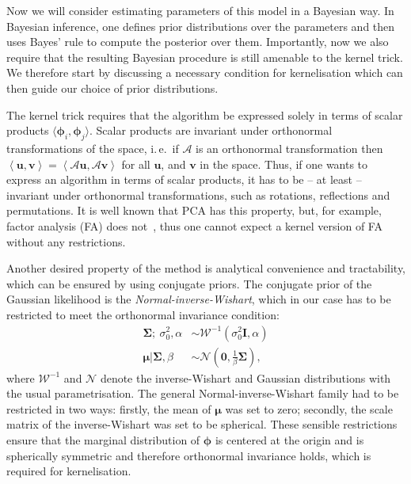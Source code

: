 \documentclass[twoside]{article}
\newcommand{\varconc}{\alpha}
\newcommand{\meanconc}{\beta}
\newcommand{\ie}{i.\,e.\ }
\begin{document}
Now we will consider estimating parameters of this model in a Bayesian way. In Bayesian inference, one defines prior distributions over the parameters and then uses Bayes' rule to compute the posterior over them. Importantly, now we also require that the resulting Bayesian procedure is still amenable to the kernel trick. We therefore start by discussing a necessary condition for kernelisation which can then guide our choice of prior distributions.

The kernel trick requires that the algorithm be expressed solely in terms of scalar products $\langle\bm{\phi}_i,\bm{\phi}_j\rangle$. Scalar products are invariant under orthonormal transformations of the space, \ie if $\mathcal{A}$ is an orthonormal transformation then $\left\langle \bm{u},\bm{v} \right\rangle = \left\langle \mathcal{A}\bm{u},\mathcal{A}\bm{v} \right\rangle$ for all $\bm{u}$, and $\bm{v}$ in the space. Thus, if one wants to express an algorithm in terms of scalar products, it has to be -- at least -- invariant under orthonormal transformations, such as
rotations, reflections and permutations. It is well known that PCA has this property, but, for example, factor analysis (FA) does not~\cite{Roweis1999}, thus one cannot expect a kernel version of FA without any restrictions.

Another desired property of the method is analytical convenience and tractability, which can be ensured by using conjugate priors. The conjugate prior of the Gaussian likelihood is the \emph{Normal-inverse-Wishart}, which in our case has to be restricted to meet the orthonormal invariance condition:
\begin{equation} \label{eqn:genmodel_mean}
\begin{split}
 \bm{\Sigma};\:\sigma_0^{2}, \varconc &\sim \mathcal{W}^{-1}\left(\sigma^{2}_0\bm{I},\varconc\right)  \\ \bm{\mu}\vert\bm{\Sigma},\meanconc &\sim \mathcal{N}\left(\bm{0},\frac{1}{\meanconc}\bm{\Sigma}\right) ,
\end{split}
\end{equation}
where $\mathcal{W}^{-1}$ and $\mathcal{N}$ denote the inverse-Wishart and Gaussian distributions with the usual parametrisation. The general Normal-inverse-Wishart family had to be restricted in two ways: firstly, the mean of $\bm{\mu}$ was set to zero; secondly, the scale matrix of the inverse-Wishart was set to be spherical. These sensible restrictions ensure that the marginal distribution of $\bm{\phi}$ is centered at the origin and is spherically symmetric and therefore orthonormal invariance holds, which is required for kernelisation.
\end{document}

